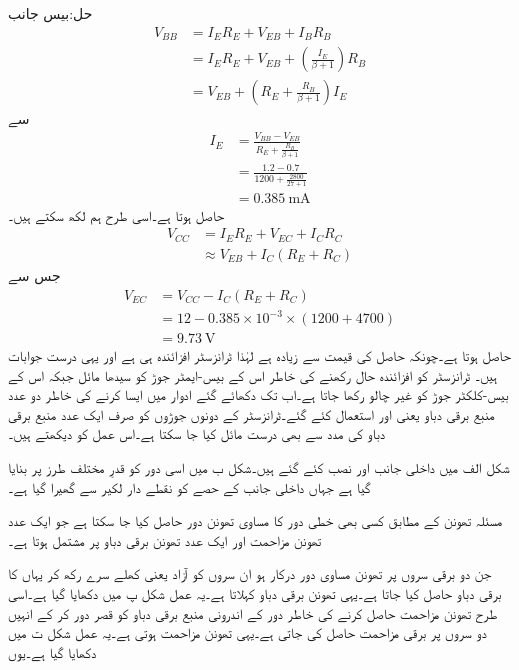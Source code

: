 حل:بیس جانب
\begin{align*}
V_{BB}&=I_E R_E+V_{EB}+I_B R_B\\
&=I_E R_E +V_{EB}+\left(\frac{I_E}{\beta+1} \right)R_B\\
&=V_{EB}+\left(R_E+\frac{R_B}{\beta+1} \right) I_E
\end{align*}
سے
\begin{align*}
I_E&=\frac{V_{BB}-V_{EB}}{R_E+\frac{R_B}{\beta+1}}\\
&=\frac{1.2-0.7}{1200+\frac{2800}{27+1}}\\
&=\SI{0.385}{\milli \ampere}
\end{align*}
حاصل ہوتا ہے۔اسی طرح ہم لکھ سکتے ہیں۔
\begin{align*}
V_{CC}&=I_E R_E +V_{EC}+I_C R_C\\
&\approx V_{EB}+I_C \left(R_E+R_C \right)
\end{align*}
جس سے
\begin{align*}
V_{EC}&=V_{CC}-I_C \left(R_E+R_C \right)\\
&=12-0.385 \times 10^{-3} \times \left(1200+4700 \right)\\
&=\SI{9.73}{\volt}
\end{align*}
حاصل ہوتا ہے۔چونکہ حاصل  کی قیمت  سے زیادہ ہے لہٰذا ٹرانزسٹر افزائندہ ہی ہے اور یہی درست جوابات ہیں۔ 
ٹرانزسٹر کو افزائندہ حال  رکھنے کی خاطر اس کے بیس-ایمٹر  جوڑ کو سیدھا مائل جبکہ اس کے بیس-کلکٹر جوڑ کو غیر چالو رکھا جاتا ہے۔اب تک دکھائے گئے ادوار میں ایسا کرنے کی خاطر دو عدد منبع برقی دباو یعنی  اور   استعمال کئے گئے۔ٹرانزسٹر کے دونوں جوڑوں کو صرف ایک عدد منبع برقی دباو کی مدد سے بھی درست مائل کیا جا سکتا ہے۔اس عمل کو دیکھتے ہیں۔

شکل  الف میں داخلی جانب   اور  نصب کئے گئے ہیں۔شکل  ب میں اسی دور کو قدرِ مختلف طرز پر بنایا گیا ہے جہاں داخلی جانب کے حصے کو نقطے دار لکیر سے گھیرا گیا ہے۔

مسئلہ تھونن  کے مطابق کسی بھی خطی دور کا مساوی تھونن دور حاصل کیا جا سکتا ہے جو ایک عدد تھونن مزاحمت   اور ایک عدد تھونن برقی دباو  پر مشتمل ہوتا ہے۔

جن دو برقی سروں پر تھونن مساوی دور درکار ہو ان سروں کو آزاد یعنی کھلے سرے  رکھ کر یہاں کا برقی دباو حاصل کیا جاتا ہے۔یہی تھونن برقی دباو  کہلاتا ہے۔یہ عمل شکل  پ میں دکھایا گیا ہے۔اسی طرح تھونن مزاحمت   حاصل کرنے کی خاطر دور کے اندرونی منبع برقی دباو  کو قصر دور  کر کے انہیں دو سروں پر برقی مزاحمت حاصل کی جاتی ہے۔یہی تھونن مزاحمت ہوتی ہے۔یہ عمل شکل  ت میں دکھایا گیا ہے۔یوں

